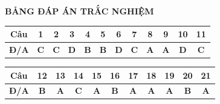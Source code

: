 
\vspace{0.3cm}
\noindent\begin{minipage}{\linewidth}
\begin{center}{\large\bfseries\color{red!80!black} BẢNG ĐÁP ÁN TRẮC NGHIỆM}\end{center}\smallskip
\begin{center}\begin{tabular}{|c|c|c|c|c|c|c|c|c|c|c|c|}\hline
\textbf{Câu} & 1 & 2 & 3 & 4 & 5 & 6 & 7 & 8 & 9 & 10 & 11 \\ \hline
\textbf{Đ/A} & \textbf{C} & \textbf{C} & \textbf{D} & \textbf{B} & \textbf{B} & \textbf{D} & \textbf{C} & \textbf{A} & \textbf{A} & \textbf{D} & \textbf{C} \\ \hline
\end{tabular}\end{center}\smallskip
\begin{center}\begin{tabular}{|c|c|c|c|c|c|c|c|c|c|c|}\hline
\textbf{Câu} & 12 & 13 & 14 & 15 & 16 & 17 & 18 & 19 & 20 & 21 \\ \hline
\textbf{Đ/A} & \textbf{B} & \textbf{A} & \textbf{C} & \textbf{A} & \textbf{B} & \textbf{A} & \textbf{A} & \textbf{A} & \textbf{B} & \textbf{A} \\ \hline
\end{tabular}\end{center}
\end{minipage}
